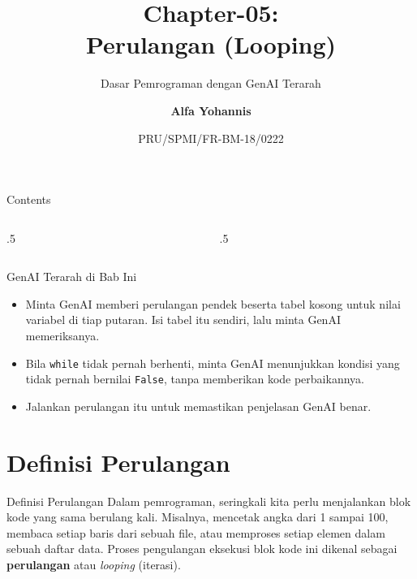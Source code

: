 \documentclass[aspectratio=169, table]{beamer}
\subtitle{Dasar Pemrograman dengan GenAI Terarah}
\title{Chapter-05:\\\LARGE{Perulangan (Looping)\\}
\vspace{10pt}}
\date[Serial]{\scriptsize {PRU/SPMI/FR-BM-18/0222}}
\author[Pradita]{\small{\textbf{Alfa Yohannis}}}
\begin{document}
\frame{\titlepage}

\begin{frame}[fragile]{Contents}
\vspace{15pt}
\begin{columns}[t]
\begin{column}{.5\textwidth}
\tableofcontents[sections={1-2}]
\end{column}
\begin{column}{.5\textwidth}
\tableofcontents[sections={3-6}]
\end{column}
\end{columns}
\end{frame}

\begin{frame}{GenAI Terarah di Bab Ini}
\small
\begin{itemize}
  \item Minta GenAI memberi perulangan pendek beserta tabel kosong untuk nilai variabel di tiap putaran. Isi tabel itu sendiri, lalu minta GenAI memeriksanya.
  \item Bila \texttt{while} tidak pernah berhenti, minta GenAI menunjukkan kondisi yang tidak pernah bernilai \texttt{False}, tanpa memberikan kode perbaikannya.
  \item Jalankan perulangan itu untuk memastikan penjelasan GenAI benar.
\end{itemize}
\end{frame}

\section{Definisi Perulangan}
\begin{frame}{Definisi Perulangan}
Dalam pemrograman, seringkali kita perlu menjalankan blok kode yang sama berulang kali. 
Misalnya, mencetak angka dari 1 sampai 100, membaca setiap baris dari sebuah file, atau 
memproses setiap elemen dalam sebuah daftar data. 
Proses pengulangan eksekusi blok kode ini dikenal sebagai \textbf{perulangan} atau \textit{looping} (iterasi).
\end{frame}
\end{document}
